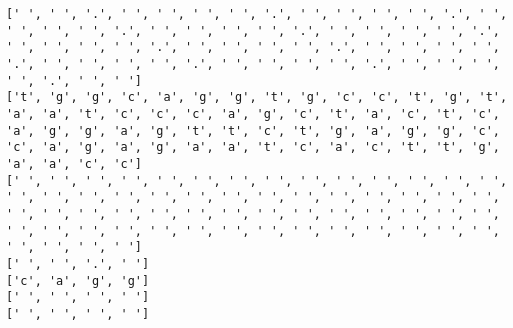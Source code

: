 \documentclass{article}
\begin{document}
\begin{Verbatim}
[' ', ' ', '.', ' ', ' ', ' ', ' ', '.', ' ', ' ', ' ', ' ', '.', ' ', ' ', ' ', ' ', '.', ' ', ' ', ' ', ' ', '.', ' ', ' ', ' ', ' ', '.', ' ', ' ', ' ', ' ', '.', ' ', ' ', ' ', ' ', '.', ' ', ' ', ' ', ' ', '.', ' ', ' ', ' ', ' ', '.', ' ', ' ', ' ', ' ', '.', ' ', ' ', ' ', ' ', '.', ' ', ' ']
['t', 'g', 'g', 'c', 'a', 'g', 'g', 't', 'g', 'c', 'c', 't', 'g', 't', 'a', 'a', 't', 'c', 'c', 'c', 'a', 'g', 'c', 't', 'a', 'c', 't', 'c', 'a', 'g', 'g', 'a', 'g', 't', 't', 'c', 't', 'g', 'a', 'g', 'g', 'c', 'c', 'a', 'g', 'a', 'g', 'a', 'a', 't', 'c', 'a', 'c', 't', 't', 'g', 'a', 'a', 'c', 'c']
[' ', ' ', ' ', ' ', ' ', ' ', ' ', ' ', ' ', ' ', ' ', ' ', ' ', ' ', ' ', ' ', ' ', ' ', ' ', ' ', ' ', ' ', ' ', ' ', ' ', ' ', ' ', ' ', ' ', ' ', ' ', ' ', ' ', ' ', ' ', ' ', ' ', ' ', ' ', ' ', ' ', ' ', ' ', ' ', ' ', ' ', ' ', ' ', ' ', ' ', ' ', ' ', ' ', ' ', ' ', ' ', ' ', ' ', ' ', ' ']
[' ', ' ', '.', ' ']
['c', 'a', 'g', 'g']
[' ', ' ', ' ', ' ']
[' ', ' ', ' ', ' ']
 

\end{Verbatim}
\end{document}
